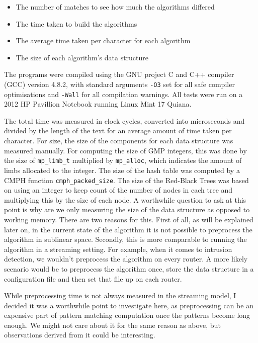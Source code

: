 \documentclass[ %
                    author={Dominic Joseph Moylett},
                    degree={MEng},
                     title={Dictionary Matching with Fingerprints},
                  subtitle={An Empirical Analysis},
                      type={research},
                      year={2015} ]{dissertation}
\begin{document}
\begin{itemize}
  \item The number of matches to see how much the algorithms differed
  \item The time taken to build the algorithms
  \item The average time taken per character for each algorithm
  \item The size of each algorithm's data structure
\end{itemize}

The programs were compiled using the GNU project C and C++ compiler (GCC) version 4.8.2, with standard arguments \texttt{-O3} set for all safe compiler optimisations and \texttt{-Wall} for all compilation warnings. All tests were run on a 2012 HP Pavillion Notebook running Linux Mint 17 Quiana.

The total time was measured in clock cycles, converted into microseconds and divided by the length of the text for an average amount of time taken per character. For size, the size of the components for each data structure was measured manually. For computing the size of GMP integers, this was done by the size of \texttt{mp\_limb\_t} multiplied by \texttt{mp\_alloc}, which indicates the amount of limbs allocated to the integer. The size of the hash table was computed by a CMPH function \texttt{cmph\_packed\_size}. The size of the Red-Black Trees was based on using an integer to keep count of the number of nodes in each tree and multiplying this by the size of each node. A worthwhile question to ask at this point is why are we only measuring the size of the data structure as opposed to working memory. There are two reasons for this. First of all, as will be explained later on, in the current state of the algorithm it is not possible to preprocess the algorithm in sublinear space. Secondly, this is more comparable to running the algorithm in a streaming setting. For example, when it comes to intrusion detection, we wouldn't preprocess the algorithm on every router. A more likely scenario would be to preprocess the algorithm once, store the data structure in a configuration file and then set that file up on each router.

While preprocessing time is not always measured in the streaming model, I decided it was a worthwhile point to investigate here, as preprocessing can be an expensive part of pattern matching computation once the patterns become long enough. We might not care about it for the same reason as above, but observations derived from it could be interesting.
\end{document}
